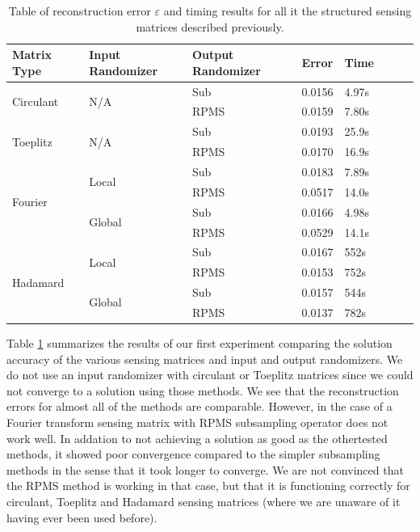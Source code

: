 \begin{table}[h] \begin{tabular}{lll|lllll} \textbf{Matrix Type}       &
		\textbf{Input Randomizer} & \textbf{Output Randomizer} & \textbf{Error} &
		\textbf{Time} & \\ \hline \multirow{2}{*}{Circulant} & \multirow{2}{*}{N/A}
		& Sub                        & 0.0156         & 4.97s         & \\ &
		& RPMS                       & 0.0159         & 7.80s         & \\ \hline


	\multirow{2}{*}{Toeplitz}  & \multirow{2}{*}{N/A}      & Sub
	& 0.0193         & 25.9s         & \\ &                           & RPMS
	& 0.0170         & 16.9s         & \\ \hline

	\multirow{4}{*}{Fourier}   & \multirow{2}{*}{Local}    & Sub
	& 0.0183         & 7.89s         & \\ &                           & RPMS
	& 0.0517         & 14.0s         & \\ & \multirow{2}{*}{Global}   & Sub
	& 0.0166         & 4.98s         & \\ &                           & RPMS
	& 0.0529         & 14.1s         & \\ \hline

	\multirow{4}{*}{Hadamard}  & \multirow{2}{*}{Local}    & Sub
	& 0.0167         & 552s          & \\ &                           & RPMS
	& 0.0153         & 752s          & \\ & \multirow{2}{*}{Global}   & Sub
	& 0.0157         & 544s          & \\ &                           & RPMS
	& 0.0137         & 782s          & \\ \end{tabular} \caption{Table of
reconstruction error $\varepsilon$ and timing results for all it the structured
sensing matrices described previously.} \label{tab:errors} \end{table}

Table \ref{tab:errors} summarizes the results of our first experiment comparing
the solution accuracy of the various sensing matrices and input and output
randomizers. We do not use an input randomizer with circulant or Toeplitz
matrices since we could not converge to a solution using those methods. We see
that the reconstruction errors for almost all of the methods are comparable.
However, in the case of a Fourier transform sensing matrix with RPMS
subsampling operator does not work well. In addation to not achieving a
solution as good as the othertested methods, it showed poor convergence
compared to the simpler subsampling methods in the sense that it took longer to
converge. We are not convinced that the RPMS method is working in that case,
but that it is functioning correctly for circulant, Toeplitz and Hadamard
sensing matrices (where we are unaware of it having ever been used before). 

